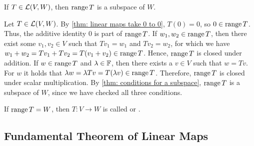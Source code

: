 \setcounter{thm}{17}
\begin{thm} 
  \label{thm: the range is a subspace}
  If $T\in \mathcal{L}(V,W)$, then $\operatorname{range} T$ is a subspace of $W$.
\end{thm}
\begin{prf}
  Let $T \in \mathcal{L} (V,W)$. By \ref{thm: linear maps take 0 to 0}, $T(0)=0$, so $0 \in \operatorname{range} T$. Thus, the additive identity $0$ is part of $\operatorname{range} T$.
  If $w_1, w_2 \in \operatorname{range} T$, then there exist some $v_1, v_2\in V$ such that $Tv_1 = w_1$ and $Tv_2 =w_2$, for which we have $w_1 + w_2 = Tv_1 + Tv_2 = T(v_1 + v_2) \in \operatorname{range} T$.
  Hence, $\operatorname{range} T$ is closed under addition.
  If $w \in \operatorname{range} T$ and $\lambda \in \mathbb{F}$, then there exists a $v \in V$ such that $w = Tv$. For $w$ it holds that
  $\lambda w = \lambda Tv = T(\lambda v) \in \operatorname{range} T$.
  Therefore, $\operatorname{range} T$ is closed under scalar multiplication. By \ref{thm: conditions for a subspace}, $\operatorname{range} T$ is a subspace of $W$, since we have checked all three conditions.
\end{prf}

\setcounter{thm}{18}
\begin{mydef} [surjectivity]
  \label{def: surjectivity}
  If $\operatorname{range} T=W$, then $T:V\to W$ is called  or .
\end{mydef}

\subsection{Fundamental Theorem of Linear Maps}

